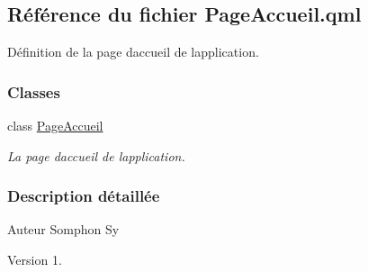 \hypertarget{_page_accueil_8qml}{}\subsection{Référence du fichier Page\+Accueil.\+qml}
\label{_page_accueil_8qml}


Définition de la page d\textquotesingle{}accueil de l\textquotesingle{}application.  


\subsubsection*{Classes}
\begin{DoxyCompactItemize}
\item 
class \hyperlink{class_page_accueil}{Page\+Accueil}
\begin{DoxyCompactList}\small\item\em La page d\textquotesingle{}accueil de l\textquotesingle{}application. \end{DoxyCompactList}\end{DoxyCompactItemize}


\subsubsection{Description détaillée}
\begin{DoxyAuthor}{Auteur}
Somphon Sy
\end{DoxyAuthor}
\begin{DoxyVersion}{Version}
1. 
\end{DoxyVersion}
